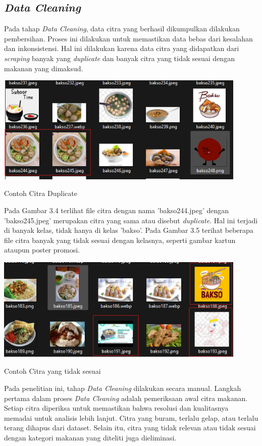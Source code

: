 \subsection{\textit{Data Cleaning}}
Pada tahap \textit{Data Cleaning}, data citra yang berhasil dikumpulkan dilakukan pembersihan. Proses ini dilakukan untuk memastikan data bebas dari kesalahan dan inkonsistensi. Hal ini dilakukan karena data citra yang didapatkan dari \textit{scraping} banyak yang \textit{duplicate} dan banyak citra yang tidak sesuai dengan makanan yang dimaksud.
\begin{afigure}
    \includegraphics[width=0.9\textwidth, center]{images/duplicate.png}
    \caption{Contoh Citra Duplicate}
    \label{fig:duplicate}
\end{afigure}

Pada Gambar 3.4 terlihat file citra dengan nama 'bakso244.jpeg' dengan 'bakso245.jpeg' merupakan citra yang sama atau disebut \textit{duplicate}. Hal ini terjadi di banyak kelas, tidak hanya di kelas 'bakso'. Pada Gambar 3.5 terihat beberapa file citra banyak yang tidak sesuai dengan kelasnya, seperti gambar kartun ataupun poster promosi.

\begin{afigure}
    \includegraphics[width=0.9\textwidth, center]{images/inconsistent-image.png}
    \caption{Contoh Citra yang tidak sesuai}
    \label{fig:inconsistent}
\end{afigure}

Pada penelitian ini, tahap \textit{Data Cleaning} dilakukan secara manual. Langkah pertama dalam proses \textit{Data Cleaning} adalah pemeriksaan awal citra makanan. Setiap citra diperiksa untuk memastikan bahwa resolusi dan kualitasnya memadai untuk analisis lebih lanjut. Citra yang buram, terlalu gelap, atau terlalu terang dihapus dari dataset. Selain itu, citra yang tidak relevan atau tidak sesuai dengan kategori makanan yang diteliti juga dieliminasi.

